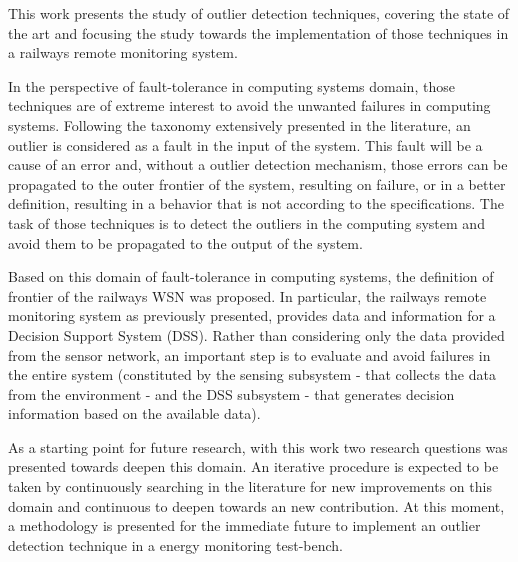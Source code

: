 

This work presents the study of outlier detection techniques, covering the state of the art and focusing the study towards the implementation of those techniques in a railways remote monitoring system.

In the perspective of fault-tolerance in computing systems domain, those techniques are of extreme interest to avoid the unwanted failures in computing systems.
Following the taxonomy extensively presented in the literature, an outlier is considered as a fault in the input of the system. This fault will be a cause of an error and, without a outlier detection mechanism, those errors can be propagated to the outer frontier of the system, resulting on failure, or in a better definition, resulting in a behavior that is not according to the specifications. 
The task of those techniques is to detect the outliers in the computing system and avoid them to be propagated to the output of the system. 

Based on this domain of fault-tolerance in computing systems, the definition of frontier of the railways WSN was proposed. In particular, the railways remote monitoring system as previously presented, provides data and information for a Decision Support System (DSS).
Rather than considering only the data provided from the sensor network, an important step is to evaluate and avoid failures in the entire system (constituted by the sensing subsystem - that collects the data from the environment - and the DSS subsystem - that generates decision information based on the available data). 

As a starting point for future research, with this work two research questions was presented towards deepen this domain. An iterative procedure is expected to be taken by continuously searching in the literature for new improvements on this domain and continuous to deepen towards an new contribution. At this moment, a methodology is presented for the immediate future to implement an outlier detection technique in a energy monitoring test-bench.